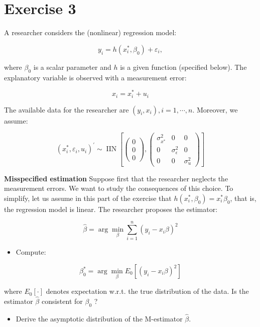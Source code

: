 \section{Exercise 3}
\label{sec:sec3}
A researcher considers the (nonlinear) regression model:

$$
y_{i}=h\left(x_{i}^{*}, \beta_{0}\right)+\varepsilon_{i},
$$

where $\beta_{0}$ is a scalar parameter and $h$ is a given function (specified below). The explanatory variable is observed with a measurement error:

$$
x_{i}=x_{i}^{*}+u_{i}
$$

The available data for the researcher are $\left(y_{i}, x_{i}\right), i=1, \cdots, n$. Moreover, we assume:

$$
\left(x_{i}^{*}, \varepsilon_{i}, u_{i}\right)^{\prime} \sim \operatorname{IIN}\left[\left(\begin{array}{l}
0 \\
0 \\
0
\end{array}\right),\left(\begin{array}{ccc}
\sigma_{x^{*}}^{2} & 0 & 0 \\
0 & \sigma_{\epsilon}^{2} & 0 \\
0 & 0 & \sigma_{u}^{2}
\end{array}\right)\right]
$$

\textbf{Misspecified estimation}
Suppose first that the researcher neglects the measurement errors. We want to study the consequences of this choice. To simplify, let us assume in this part of the exercise that $h\left(x_{i}^{*}, \beta_{0}\right)=x_{i}^{*} \beta_{0}$, that is, the regression model is linear. The researcher proposes the estimator:

$$
\hat{\beta}=\arg \min _{\beta} \sum_{i=1}^{n}\left(y_{i}-x_{i} \beta\right)^{2}
$$

\begin{itemize}
  \item Compute:
\end{itemize}

$$
\beta_{0}^{*}=\arg \min _{\beta} E_{0}\left[\left(y_{i}-x_{i} \beta\right)^{2}\right]
$$

where $E_{0}[\cdot]$ denotes expectation w.r.t. the true distribution of the data. Is the estimator $\hat{\beta}$ consistent for $\beta_{0}$ ?

\begin{itemize}
  \item Derive the asymptotic distribution of the M-estimator $\hat{\beta}$.
\end{itemize}